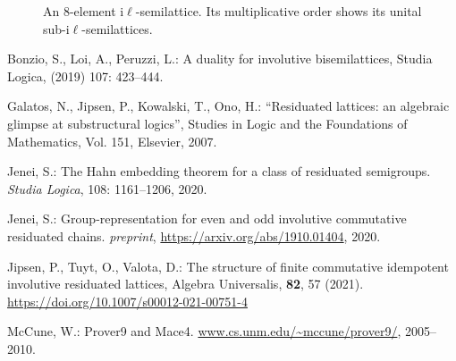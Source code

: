 \documentclass[12pt]{amsart}
\begin{document}
\begin{figure}%
  \begin{center}
  \qquad \qquad
\end{center}
  \caption{An 8-element i$\ell$-semilattice. Its multiplicative order shows its unital sub-i$\ell$-semilattices.}
  \label{subsemilattice}
\end{figure}
\clearpage
\begin{thebibliography}{9}
Bonzio, S., Loi, A., Peruzzi, L.: 
A duality for involutive bisemilattices, Studia Logica, (2019) 107: 423--444.

Galatos, N., Jipsen, P., Kowalski, T., Ono, H.: 
``Residuated lattices: an algebraic glimpse at substructural logics'', 
Studies in Logic and the Foundations of Mathematics, Vol. 151, Elsevier, 2007.

Jenei, S.:
The Hahn embedding theorem for a class of residuated semigroups.
{\em Studia Logica}, 108: 1161–1206, 2020.

Jenei, S.:
Group-representation for even and odd involutive commutative residuated chains.
{\em preprint}, \url{https://arxiv.org/abs/1910.01404}, 2020.

Jipsen, P., Tuyt, O., Valota, D.: 
The structure of finite commutative idempotent involutive residuated lattices, 
Algebra Universalis, \textbf{82}, 57 (2021). 
\url{https://doi.org/10.1007/s00012-021-00751-4}

McCune, W.: 
Prover9 and Mace4. \url{www.cs.unm.edu/~mccune/prover9/}, 2005–2010.
\end{thebibliography}
\end{document}
